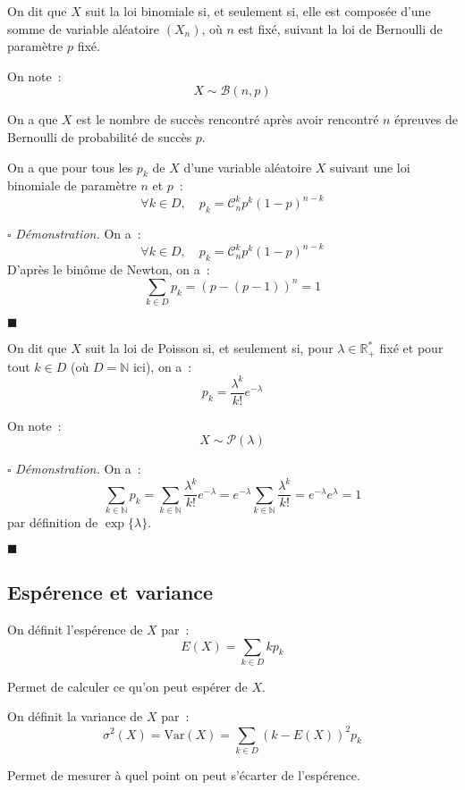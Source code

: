 \documentclass[a4paper, titlepage]{article}
\renewenvironment{proof}{$\square$ \footnotesize\textit{Démonstration.}}{\begin{flushright}$\blacksquare$\end{flushright}}
\begin{document}
	\begin{defn}
		On dit que $X$ suit la loi binomiale si, et seulement si, elle est composée d'une somme de variable aléatoire $(X_n)$, où $n$ est fixé, suivant la loi de Bernoulli de paramètre $p$ fixé.

		On note~:
		$$ X\sim\mathcal{B}(n,p) $$
	\end{defn}
	On a que $X$ est le nombre de succès rencontré après avoir rencontré $n$ épreuves de Bernoulli de probabilité de succès $p$.

	\begin{props}
		On a que pour tous les $p_k$ de $X$ d'une variable aléatoire $X$ suivant une loi binomiale de paramètre $n$ et $p$~:
		$$ \forall k\in D,\quad p_k = \mathcal{C}^k_n p^k(1-p)^{n-k} $$
	\end{props}
	\begin{proof}
		On a~:
		$$ \forall k\in D,\quad p_k = \mathcal{C}^k_n p^k(1-p)^{n-k} $$
		D'après le binôme de Newton, on a~:
		$$ \sum_{k\in D} p_k = (p-(p-1))^{n} = 1 $$
	\end{proof}

	\begin{defn}
		On dit que $X$ suit la loi de Poisson si, et seulement si, pour $\lambda\in\mathbb{R}^*_+$ fixé et pour tout $k\in D$ (où $D=\mathbb{N}$ ici), on a~:
		$$ p_k = \frac{\lambda^k}{k!}e^{-\lambda} $$

		On note~:
		$$ X\sim\mathcal{P}(\lambda) $$
	\end{defn}
	\begin{proof}
		On a~:
		$$ \sum_{k\in\mathbb{N}} p_k = \sum_{k\in\mathbb{N}} \frac{\lambda^k}{k!}e^{-\lambda} = e^{-\lambda}\sum_{k\in\mathbb{N}} \frac{\lambda^k}{k!} = e^{-\lambda}e^{\lambda} = 1 $$
		par définition de $\exp\{\lambda\}$.
	\end{proof}
	
	\subsection{Espérence et variance}
	\begin{defn}
		On définit l'espérence de $X$ par~:
		$$ E(X) = \sum_{k\in D} kp_k $$
	\end{defn}
	Permet de calculer ce qu'on peut espérer de $X$.

	\begin{defn}
		On définit la variance de $X$ par~:
		$$ \sigma^2(X) = \mathrm{Var}(X) = \sum_{k\in D} (k-E(X))^2p_k $$
	\end{defn}
	Permet de mesurer à quel point on peut s'écarter de l'espérence.
\end{document}
